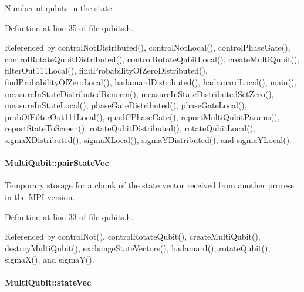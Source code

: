 Number of qubits in the state. 



Definition at line 35 of file qubits.\+h.



Referenced by control\+Not\+Distributed(), control\+Not\+Local(), control\+Phase\+Gate(), control\+Rotate\+Qubit\+Distributed(), control\+Rotate\+Qubit\+Local(), create\+Multi\+Qubit(), filter\+Out111\+Local(), find\+Probability\+Of\+Zero\+Distributed(), find\+Probability\+Of\+Zero\+Local(), hadamard\+Distributed(), hadamard\+Local(), main(), measure\+In\+State\+Distributed\+Renorm(), measure\+In\+State\+Distributed\+Set\+Zero(), measure\+In\+State\+Local(), phase\+Gate\+Distributed(), phase\+Gate\+Local(), prob\+Of\+Filter\+Out111\+Local(), quad\+C\+Phase\+Gate(), report\+Multi\+Qubit\+Params(), report\+State\+To\+Screen(), rotate\+Qubit\+Distributed(), rotate\+Qubit\+Local(), sigma\+X\+Distributed(), sigma\+X\+Local(), sigma\+Y\+Distributed(), and sigma\+Y\+Local().

\paragraph[{\texorpdfstring{pair\+State\+Vec}{pairStateVec}}]{ Multi\+Qubit\+::pair\+State\+Vec}\hypertarget{structMultiQubit_a76f7db4eab52d2b30f58f973ada809c5}{}\label{structMultiQubit_a76f7db4eab52d2b30f58f973ada809c5}


Temporary storage for a chunk of the state vector received from another process in the M\+PI version. 



Definition at line 33 of file qubits.\+h.



Referenced by control\+Not(), control\+Rotate\+Qubit(), create\+Multi\+Qubit(), destroy\+Multi\+Qubit(), exchange\+State\+Vectors(), hadamard(), rotate\+Qubit(), sigma\+X(), and sigma\+Y().

\paragraph[{\texorpdfstring{state\+Vec}{stateVec}}]{ Multi\+Qubit\+::state\+Vec}\hypertarget{structMultiQubit_a45483190d6b01ef6b2f98f2bec9ab94f}{}\label{structMultiQubit_a45483190d6b01ef6b2f98f2bec9ab94f}


